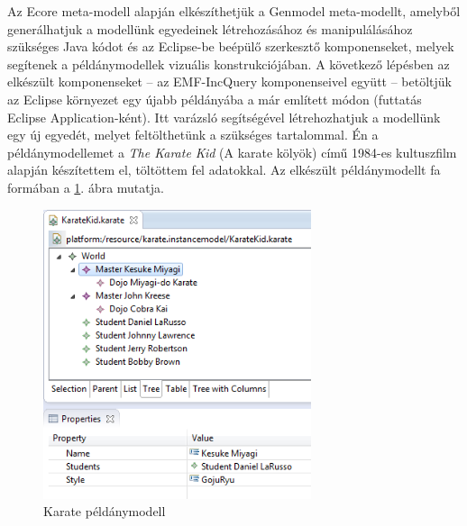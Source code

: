 Az Ecore meta-modell alapján elkészíthetjük a Genmodel meta-modellt, amelyből generálhatjuk a modellünk egyedeinek létrehozásához és manipulálásához szükséges Java kódot és az Eclipse-be beépülő szerkesztő komponenseket, melyek segítenek a példánymodellek vizuális konstrukciójában.
A következő lépésben az elkészült komponenseket -- az EMF-IncQuery komponenseivel együtt -- betöltjük az Eclipse környezet egy újabb példányába a már említett módon (futtatás Eclipse Application-ként).
Itt varázsló segítségével létrehozhatjuk a modellünk egy új egyedét, melyet feltölthetünk a szükséges tartalommal.
Én a példánymodellemet a \emph{The Karate Kid} (A karate kölyök) című 1984-es kultuszfilm alapján készítettem el, töltöttem fel adatokkal.
Az elkészült példánymodellt fa formában a \ref{fig:karateInstanceModel}. ábra mutatja.
%
\begin{figure}[htb]
\centering
\includegraphics[width=0.70\textwidth]{figures/karate-instance-tree-with-properties.png}
\caption{Karate példánymodell}
\label{fig:karateInstanceModel}
\end{figure}
%

